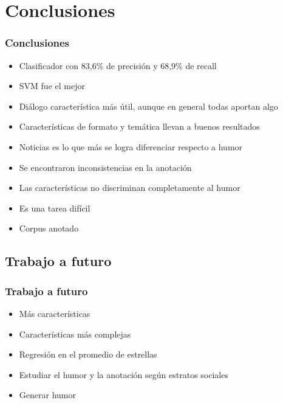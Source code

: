 \section{Conclusiones}

\begin{frame}
    \frametitle{Conclusiones}
    
    \begin{itemize}
        \item[\checkmark] Clasificador con 83,6\% de precisión y 68,9\% de recall
        \item[\checkmark] SVM fue el mejor
        \item[\checkmark] Diálogo característica más útil, aunque en general todas aportan algo
        \item[\checkmark] Características de formato y temática llevan a buenos resultados
        \item[\checkmark] Noticias es lo que más se logra diferenciar respecto a humor
        \item[\checkmark] Se encontraron inconsistencias en la anotación
        \item[\checkmark] Las características no discriminan completamente al humor
        \item[\checkmark] Es una tarea difícil
        \item[\checkmark] Corpus anotado
    \end{itemize}
\end{frame}

\subsection{Trabajo a futuro}
\begin{frame}
    \frametitle{Trabajo a futuro}
    
    \begin{itemize}
        \item Más características
        \item Características más complejas
        \item Regresión en el promedio de estrellas
        \item Estudiar el humor y la anotación según estratos sociales
        \item Generar humor
    \end{itemize}
\end{frame}
